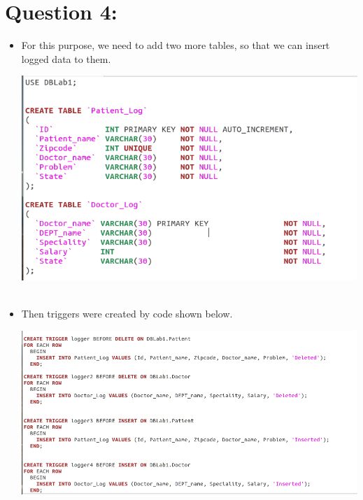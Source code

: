 \documentclass{article}
\begin{document}
\section{Question 4:}
\begin{itemize}
    \item
    For this purpose, we need to add two more tables, so that we can insert logged data to them.
    
    	\includegraphics[scale=0.4]{figs/4_1.png}\
    \item
    Then triggers were created by code shown below.
    
		\includegraphics[scale=0.4]{figs/4_2.png}\
\end{itemize}
\end{document}
